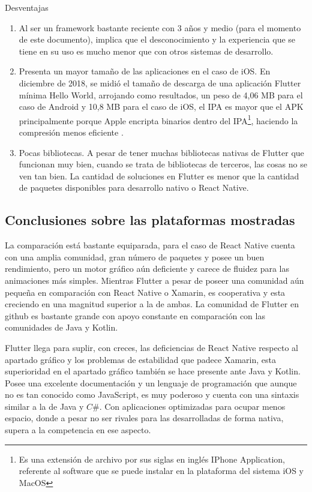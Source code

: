 Desventajas
\begin{enumerate}


\item	Al ser un framework bastante reciente con 3 años y medio (para el momento de este documento), implica que el desconocimiento y la experiencia que se tiene en su uso es mucho menor que con otros sistemas de desarrollo.
\item	Presenta un mayor tamaño de las aplicaciones en el caso de iOS. En diciembre de 2018, se midió el tamaño de descarga de una aplicación Flutter mínima Hello World, arrojando como resultados, un peso de 4,06 MB para el caso de Android y 10,8 MB para el caso de iOS, el IPA  es mayor que el APK principalmente porque Apple encripta binarios dentro del IPA\footnote{Es una extensión de archivo por sus siglas en inglés IPhone Application, referente al software que se puede instalar en la plataforma del sistema iOS y MacOS}, haciendo la compresión menos eficiente .
\item	Pocas bibliotecas. A pesar de tener muchas bibliotecas nativas de Flutter que funcionan muy bien, cuando se trata de bibliotecas de terceros, las cosas no se ven tan bien. La cantidad de soluciones en Flutter es menor que la cantidad de paquetes disponibles para desarrollo nativo o React Native.
\end{enumerate}

\subsection{Conclusiones sobre las plataformas mostradas}\label{chapter:introduction}

La comparación está bastante equiparada, para el caso de React Native cuenta con una amplia comunidad, gran número de paquetes y posee un buen rendimiento, pero un motor gráfico aún deficiente y carece de fluidez para las animaciones más simples. Mientras Flutter a pesar de poseer una comunidad aún pequeña en comparación con React Native o Xamarin, es cooperativa y esta creciendo en una magnitud superior a la de ambas. La comunidad de Flutter en github es bastante grande con apoyo constante en comparación con las comunidades de Java y Kotlin.

Flutter llega para suplir, con creces, las deficiencias de React Native respecto al apartado gráfico y los problemas de estabilidad que padece Xamarin, esta superioridad en el apartado gráfico también se hace presente ante Java y Kotlin. Posee una excelente documentación y un lenguaje de programación que aunque no es tan conocido como JavaScript, es muy poderoso y cuenta con una sintaxis similar a la de Java y $C\#$. Con aplicaciones optimizadas para ocupar menos espacio, donde a pesar no ser rivales para las desarrolladas de forma nativa, supera a la competencia en ese aspecto.

